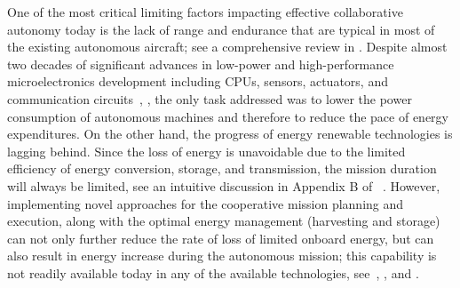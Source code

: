 \documentclass{ifacconf}
\begin{document}
One of the most critical limiting factors impacting effective
collaborative autonomy today is the lack of range and endurance that are
typical in most of the existing autonomous aircraft; see a comprehensive
review in \cite{NAC:2005}.
%
%
Despite almost two decades of significant advances in low-power and
high-performance microelectronics development including CPUs, sensors,
actuators, and communication circuits~\cite{Tong:1995}, \cite{Singh:2010},
the only task addressed was to lower the power consumption of autonomous
machines and therefore to reduce the pace of energy expenditures. On the
other hand, the progress of energy renewable technologies is lagging behind.
Since the loss of energy is unavoidable due to the limited efficiency of
energy conversion, storage, and transmission, the mission duration will
always be limited, see an intuitive discussion in Appendix B of
~\cite{NAC:2005}. However, implementing novel approaches for the cooperative
mission planning and execution, along with the optimal energy management
(harvesting and storage) can not only further reduce the rate of loss of
limited onboard energy, but can also result in energy increase during the
autonomous mission; this capability is not readily available today in any of
the available technologies, see~\cite{Siciliano:2008}, \cite{Martinez:2008},
and \cite{Nonami:2013}.

\end{document}
